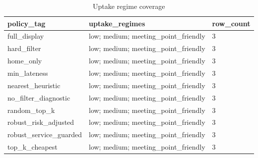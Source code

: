 \begin{table}[ht]
\centering
\begin{tabular}{lll}
 \hline
policy\_tag & uptake\_regimes & row\_count \\
 \hline
full\_display & low; medium; meeting\_point\_friendly & 3 \\
hard\_filter & low; medium; meeting\_point\_friendly & 3 \\
home\_only & low; medium; meeting\_point\_friendly & 3 \\
min\_lateness & low; medium; meeting\_point\_friendly & 3 \\
nearest\_heuristic & low; medium; meeting\_point\_friendly & 3 \\
no\_filter\_diagnostic & low; medium; meeting\_point\_friendly & 3 \\
random\_top\_k & low; medium; meeting\_point\_friendly & 3 \\
robust\_risk\_adjusted & low; medium; meeting\_point\_friendly & 3 \\
robust\_service\_guarded & low; medium; meeting\_point\_friendly & 3 \\
top\_k\_cheapest & low; medium; meeting\_point\_friendly & 3 \\
 \hline
\end{tabular}
\caption{Uptake regime coverage}
\end{table}
